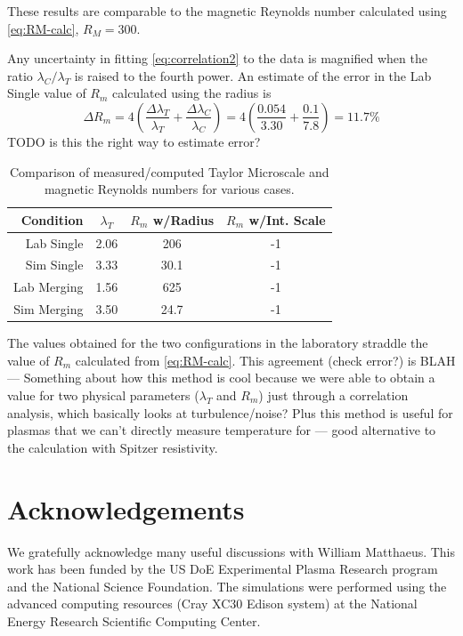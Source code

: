 \documentclass[aip,prl,amsmath,amssymb,reprint,superscriptaddress]{revtex4-1} %
\begin{document}
These results are comparable to the magnetic Reynolds number calculated using \eqref{eq:RM-calc}, $R_M = 300$. 

Any uncertainty in fitting \eqref{eq:correlation2} to the data is magnified when the ratio $\lambda_C/\lambda_T$ is raised to the fourth power. An estimate of the error in the Lab Single value of $R_m$ calculated using the radius is 
%
\begin{equation}
\Delta R_m = 4 (\dfrac{\Delta \lambda_T}{\lambda_T} + \dfrac{\Delta \lambda_C}{\lambda_C}) = 4 (\dfrac{0.054}{3.30} + \dfrac{0.1}{7.8})= 11.7\%
\label{eq:error}
\end{equation}
%
\textsf{TODO is this the right way to estimate error?}

\begin{table} [htbp]
\caption{\label{tab:Rms}Comparison of measured/computed Taylor Microscale and magnetic Reynolds numbers for various cases.}
\begin{tabular}{|r|c|c|c|}
\hline
Condition& $\lambda_{T}$&$R_{m}$ w/Radius&$R_{m}$ w/Int. Scale\\
\hline
Lab Single  & 2.06 & 206 & -1\\
Sim Single  & 3.33 & 30.1 & -1\\
Lab Merging & 1.56 & 625 & -1\\
Sim Merging & 3.50 & 24.7 & -1\\
\hline
\end{tabular}
\end{table}

The values obtained for the two configurations in the laboratory straddle the value of $R_m$ calculated from \eqref{eq:RM-calc}. This agreement (check error?) is BLAH --- \textsf{Something about how this method is cool because we were able to obtain a value for two physical parameters ($\lambda_T$ and $R_m$) just through a correlation analysis, which basically looks at turbulence/noise? Plus this method is useful for plasmas that we can't directly measure temperature for --- good alternative to the calculation with Spitzer resistivity.}


\section*{Acknowledgements}
We gratefully acknowledge many useful discussions with William Matthaeus. This work has been funded by the US DoE Experimental Plasma Research program and the National Science Foundation.  The simulations were performed using the advanced computing resources (Cray XC30 Edison system) at the National Energy Research Scientific Computing Center.
\end{document}
